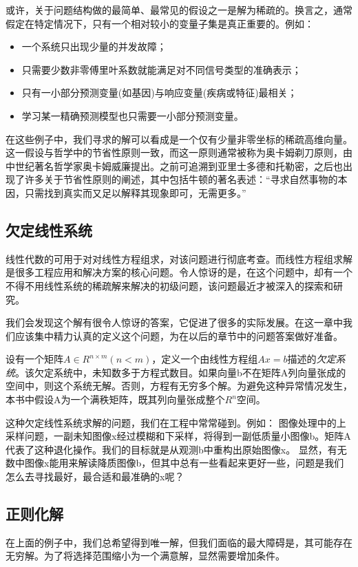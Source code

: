 或许，关于问题结构做的最简单、最常见的假设之一是解为稀疏的。换言之，通常假定在特定情况下，只有一个相对较小的变量子集是真正重要的。例如：
\begin{itemize}
	\item 一个系统只出现少量的并发故障；
	\item 只需要少数非零傅里叶系数就能满足对不同信号类型的准确表示；
	\item 只有一小部分预测变量(如基因)与响应变量(疾病或特征)最相关；
	\item 学习某一精确预测模型也只需要一小部分预测变量。
\end{itemize}
在这些例子中，我们寻求的解可以看成是一个仅有少量非零坐标的稀疏高维向量。这一假设与哲学中的节省性原则一致，而这一原则通常被称为奥卡姆剃刀原则，由中世纪著名哲学家奥卡姆威廉提出。之前可追溯到亚里士多德和托勒密，之后也出现了许多关于节省性原则的阐述，其中包括牛顿的著名表述：“寻求自然事物的本因，只需找到真实而又足以解释其现象即可，无需更多。”


\subsection{欠定线性系统}

线性代数的可用于对对线性方程组求，对该问题进行彻底考查。而线性方程组求解是很多工程应用和解决方案的核心问题。令人惊讶的是，在这个问题中，却有一个不得不用线性系统的稀疏解来解决的初级问题，该问题最近才被深入的探索和研究。

{\heiti 
我们会发现这个解有很令人惊讶的答案，它促进了很多的实际发展。在这一章中我们应该集中精力认真的定义这个问题，为在以后的章节中的问题答案做好准备。}


设有一个矩阵$A\in R^{n\times m}(n<m)$，定义一个由线性方程组$Ax=b$描述的\emph{欠定系统}。该欠定系统中，未知数多于方程式数目。如果向量b不在矩阵A列向量张成的空间中，则这个系统无解。否则，方程有无穷多个解。为避免这种异常情况发生，本书中假设A为一个满秩矩阵，既其列向量张成整个$R^n$空间。

这种欠定线性系统求解的问题，我们在工程中常常碰到。例如：
{\heiti
图像处理中的上采样问题，一副未知图像x经过模糊和下采样，将得到一副低质量小图像b。矩阵A代表了这种退化操作。我们的目标就是从观测b中重构出原始图像x。
}
显然，有无数中图像x能用来解读降质图像b，但其中总有一些看起来更好一些，问题是我们怎么去寻找最好，最合适和最准确的x呢？


\subsection{正则化解}
在上面的例子中，我们总希望得到唯一解，但我们面临的最大障碍是，其可能存在无穷解。为了将选择范围缩小为一个满意解，显然需要增加条件。


